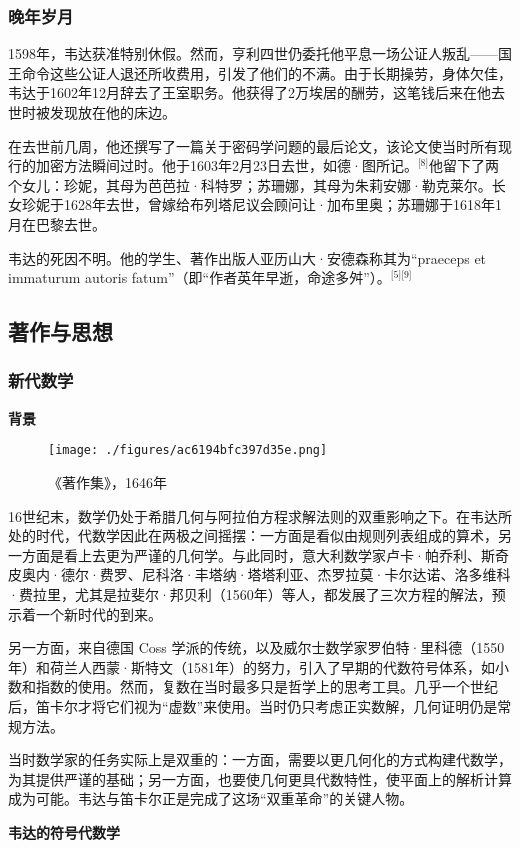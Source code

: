 \subsubsection{晚年岁月}
1598年，韦达获准特别休假。然而，亨利四世仍委托他平息一场公证人叛乱——国王命令这些公证人退还所收费用，引发了他们的不满。由于长期操劳，身体欠佳，韦达于1602年12月辞去了王室职务。他获得了2万埃居的酬劳，这笔钱后来在他去世时被发现放在他的床边。

在去世前几周，他还撰写了一篇关于密码学问题的最后论文，该论文使当时所有现行的加密方法瞬间过时。他于1603年2月23日去世，如德·图所记。\(^\text{[8]}\)他留下了两个女儿：珍妮，其母为芭芭拉·科特罗；苏珊娜，其母为朱莉安娜·勒克莱尔。长女珍妮于1628年去世，曾嫁给布列塔尼议会顾问让·加布里奥；苏珊娜于1618年1月在巴黎去世。

韦达的死因不明。他的学生、著作出版人亚历山大·安德森称其为“praeceps et immaturum autoris fatum”（即“作者英年早逝，命途多舛”）。\(^\text{[5][9]}\)
\subsection{著作与思想}
\subsubsection{新代数学}
\textbf{背景}
\begin{figure}[ht]
\centering
\texttt{[image: ./figures/ac6194bfc397d35e.png]}
\caption{《著作集》，1646年} \label{fig_WD_2}
\end{figure}
16世纪末，数学仍处于希腊几何与阿拉伯方程求解法则的双重影响之下。在韦达所处的时代，代数学因此在两极之间摇摆：一方面是看似由规则列表组成的算术，另一方面是看上去更为严谨的几何学。与此同时，意大利数学家卢卡·帕乔利、斯奇皮奥内·德尔·费罗、尼科洛·丰塔纳·塔塔利亚、杰罗拉莫·卡尔达诺、洛多维科·费拉里，尤其是拉斐尔·邦贝利（1560年）等人，都发展了三次方程的解法，预示着一个新时代的到来。

另一方面，来自德国 Coss 学派的传统，以及威尔士数学家罗伯特·里科德（1550年）和荷兰人西蒙·斯特文（1581年）的努力，引入了早期的代数符号体系，如小数和指数的使用。然而，复数在当时最多只是哲学上的思考工具。几乎一个世纪后，笛卡尔才将它们视为“虚数”来使用。当时仍只考虑正实数解，几何证明仍是常规方法。

当时数学家的任务实际上是双重的：一方面，需要以更几何化的方式构建代数学，为其提供严谨的基础；另一方面，也要使几何更具代数特性，使平面上的解析计算成为可能。韦达与笛卡尔正是完成了这场“双重革命”的关键人物。

\textbf{韦达的符号代数学}


